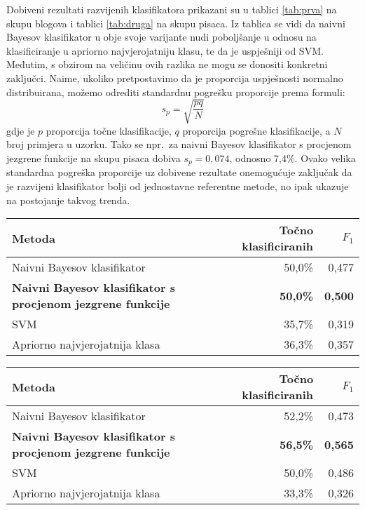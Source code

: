 \documentclass[10pt, a4paper]{article}
\begin{document}
Dobiveni rezultati razvijenih klasifikatora prikazani su u tablici \ref{tab:prva} na skupu blogova i tablici \ref{tab:druga} na skupu pisaca. Iz tablica se vidi da naivni Bayesov klasifikator u obje svoje varijante nudi poboljšanje u odnosu na klasificiranje u apriorno najvjerojatniju klasu, te da je uspješniji od SVM. Međutim, s obzirom na veličinu ovih razlika ne mogu se donositi konkretni zaključci. Naime, ukoliko pretpostavimo da je proporcija uspješnosti normalno distribuirana, možemo odrediti standardnu pogrešku proporcije prema formuli:
\[
s_p = \sqrt{\frac{pq}{N}}
\]
\noindent gdje je $p$ proporcija točne klasifikacije, $q$ proporcija pogrešne klasifikacije, a $N$ broj primjera u uzorku. Tako se npr.~za naivni Bayesov klasifikator s procjenom jezgrene funkcije na skupu pisaca dobiva $s_p = 0,074$, odnosno 7,4\%. Ovako velika standardna pogreška proporcije uz dobivene rezultate onemogućuje zaključak da je razvijeni klasifikator bolji od jednostavne referentne metode, no ipak ukazuje na postojanje takvog trenda.

\begin{table*}
\caption{Postotak točno klasificiranih primjera  i  $F_1$ mjera na skupu blogova korištenjem različitih algoritama.}
\label{tab:prva}
\begin{center}
\begin{tabular}{lrr}
\toprule
Metoda & Točno klasificiranih & $F_1$ \\
\midrule
Naivni Bayesov klasifikator & 50,0\% & 0,477\\
 \textbf{Naivni Bayesov klasifikator s procjenom jezgrene funkcije}   & \textbf{50,0\%} &  \textbf{0,500}\\
SVM   & 35,7\% & 0,319\\
Apriorno najvjerojatnija klasa & 36,3\% & 0,357\\
\bottomrule
\end{tabular}
\end{center}
\end{table*}



\begin{table*}
\caption{Postotak točno klasificiranih primjera  i $F_1$ mjera na skupu pisaca korištenjem različitih algoritama. }
\label{tab:druga}
\begin{center}
\begin{tabular}{lrr}
\toprule
Metoda & Točno klasificiranih &  $F_1$\\
\midrule
Naivni Bayesov klasifikator & 52,2\% & 0,473\\
 \textbf{Naivni Bayesov klasifikator s procjenom jezgrene funkcije} &  \textbf{56,5\%} & \textbf{0,565}\\
SVM & 50,0\% & 0,486\\
Apriorno najvjerojatnija klasa & 33,3\% & 0,326\\
\bottomrule
\end{tabular}
\end{center}
\end{table*}
\end{document}

